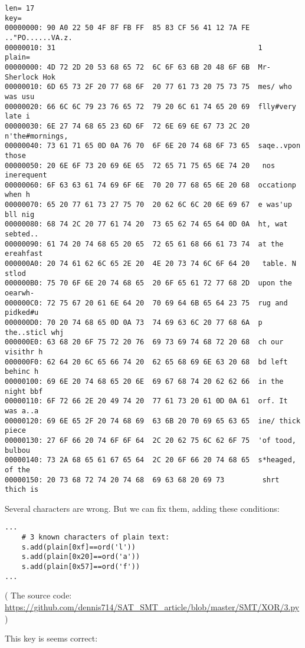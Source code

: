 \begin{lstlisting}
len= 17
key=
00000000: 90 A0 22 50 4F 8F FB FF  85 83 CF 56 41 12 7A FE  .."PO......VA.z.
00000010: 31                                                1
plain=
00000000: 4D 72 2D 20 53 68 65 72  6C 6F 63 6B 20 48 6F 6B  Mr- Sherlock Hok
00000010: 6D 65 73 2F 20 77 68 6F  20 77 61 73 20 75 73 75  mes/ who was usu
00000020: 66 6C 6C 79 23 76 65 72  79 20 6C 61 74 65 20 69  flly#very late i
00000030: 6E 27 74 68 65 23 6D 6F  72 6E 69 6E 67 73 2C 20  n'the#mornings,
00000040: 73 61 71 65 0D 0A 76 70  6F 6E 20 74 68 6F 73 65  saqe..vpon those
00000050: 20 6E 6F 73 20 69 6E 65  72 65 71 75 65 6E 74 20   nos inerequent
00000060: 6F 63 63 61 74 69 6F 6E  70 20 77 68 65 6E 20 68  occationp when h
00000070: 65 20 77 61 73 27 75 70  20 62 6C 6C 20 6E 69 67  e was'up bll nig
00000080: 68 74 2C 20 77 61 74 20  73 65 62 74 65 64 0D 0A  ht, wat sebted..
00000090: 61 74 20 74 68 65 20 65  72 65 61 68 66 61 73 74  at the ereahfast
000000A0: 20 74 61 62 6C 65 2E 20  4E 20 73 74 6C 6F 64 20   table. N stlod
000000B0: 75 70 6F 6E 20 74 68 65  20 6F 65 61 72 77 68 2D  upon the oearwh-
000000C0: 72 75 67 20 61 6E 64 20  70 69 64 6B 65 64 23 75  rug and pidked#u
000000D0: 70 20 74 68 65 0D 0A 73  74 69 63 6C 20 77 68 6A  p the..sticl whj
000000E0: 63 68 20 6F 75 72 20 76  69 73 69 74 68 72 20 68  ch our visithr h
000000F0: 62 64 20 6C 65 66 74 20  62 65 68 69 6E 63 20 68  bd left behinc h
00000100: 69 6E 20 74 68 65 20 6E  69 67 68 74 20 62 62 66  in the night bbf
00000110: 6F 72 66 2E 20 49 74 20  77 61 73 20 61 0D 0A 61  orf. It was a..a
00000120: 69 6E 65 2F 20 74 68 69  63 6B 20 70 69 65 63 65  ine/ thick piece
00000130: 27 6F 66 20 74 6F 6F 64  2C 20 62 75 6C 62 6F 75  'of tood, bulbou
00000140: 73 2A 68 65 61 67 65 64  2C 20 6F 66 20 74 68 65  s*heaged, of the
00000150: 20 73 68 72 74 20 74 68  69 63 68 20 69 73         shrt thich is
\end{lstlisting}

Several characters are wrong.
But we can fix them, adding these conditions:

\begin{lstlisting}
...
    # 3 known characters of plain text:
    s.add(plain[0xf]==ord('l'))
    s.add(plain[0x20]==ord('a'))
    s.add(plain[0x57]==ord('f'))
...
\end{lstlisting}

( The source code: \url{https://github.com/dennis714/SAT_SMT_article/blob/master/SMT/XOR/3.py} )

This key is seems correct:

